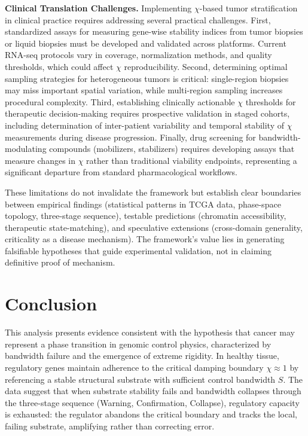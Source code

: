 \documentclass[11pt,letterpaper]{article}
\begin{document}
\textbf{Clinical Translation Challenges.} Implementing $\chi$-based tumor stratification in clinical practice requires addressing several practical challenges. First, standardized assays for measuring gene-wise stability indices from tumor biopsies or liquid biopsies must be developed and validated across platforms. Current RNA-seq protocols vary in coverage, normalization methods, and quality thresholds, which could affect $\chi$ reproducibility. Second, determining optimal sampling strategies for heterogeneous tumors is critical: single-region biopsies may miss important spatial variation, while multi-region sampling increases procedural complexity. Third, establishing clinically actionable $\chi$ thresholds for therapeutic decision-making requires prospective validation in staged cohorts, including determination of inter-patient variability and temporal stability of $\chi$ measurements during disease progression. Finally, drug screening for bandwidth-modulating compounds (mobilizers, stabilizers) requires developing assays that measure changes in $\chi$ rather than traditional viability endpoints, representing a significant departure from standard pharmacological workflows.

These limitations do not invalidate the framework but establish clear boundaries between empirical findings (statistical patterns in TCGA data, phase-space topology, three-stage sequence), testable predictions (chromatin accessibility, therapeutic state-matching), and speculative extensions (cross-domain generality, criticality as a disease mechanism). The framework's value lies in generating falsifiable hypotheses that guide experimental validation, not in claiming definitive proof of mechanism.

\section{Conclusion}

This analysis presents evidence consistent with the hypothesis that cancer may represent a phase transition in genomic control physics, characterized by bandwidth failure and the emergence of extreme rigidity. In healthy tissue, regulatory genes maintain adherence to the critical damping boundary $\chi \approx 1$ by referencing a stable structural substrate with sufficient control bandwidth $S$. The data suggest that when substrate stability fails and bandwidth collapses through the three-stage sequence (Warning, Confirmation, Collapse), regulatory capacity is exhausted: the regulator abandons the critical boundary and tracks the local, failing substrate, amplifying rather than correcting error.
\end{document}
